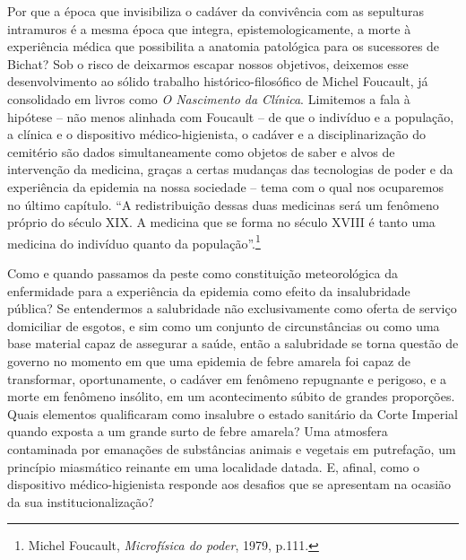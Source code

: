 Por que a época que invisibiliza o cadáver da convivência com as
sepulturas intramuros é a mesma época que integra, epistemologicamente,
a morte à experiência médica que possibilita a anatomia patológica para
os sucessores de Bichat? Sob o risco de deixarmos escapar nossos
objetivos, deixemos esse desenvolvimento ao sólido trabalho
histórico-filosófico de Michel Foucault, já consolidado em livros como
\emph{O Nascimento da Clínica}. Limitemos a fala à hipótese -- não menos
alinhada com Foucault -- de que o indivíduo e a população, a clínica e o
dispositivo médico-higienista, o cadáver e a disciplinarização do
cemitério são dados simultaneamente como objetos de saber e alvos de
intervenção da medicina, graças a certas mudanças das tecnologias de
poder e da experiência da epidemia na nossa sociedade -- tema com o qual
nos ocuparemos no último capítulo. ``A redistribuição dessas duas
medicinas será um fenômeno próprio do século XIX. A medicina que se
forma no século XVIII é tanto uma medicina do indivíduo quanto da
população''.\footnote{Michel Foucault, \emph{Microfísica do poder},
  1979, p.111.}

Como e quando passamos da peste como constituição meteorológica da
enfermidade para a experiência da epidemia como efeito da insalubridade
pública? Se entendermos a salubridade não exclusivamente como oferta de
serviço domiciliar de esgotos, e sim como um conjunto de circunstâncias
ou como uma base material capaz de assegurar a saúde, então a
salubridade se torna questão de governo no momento em que uma epidemia
de febre amarela foi capaz de transformar, oportunamente, o cadáver em
fenômeno repugnante e perigoso, e a morte em fenômeno insólito, em um
acontecimento súbito de grandes proporções. Quais elementos qualificaram
como insalubre o estado sanitário da Corte Imperial quando exposta a um
grande surto de febre amarela? Uma atmosfera contaminada por emanações
de substâncias animais e vegetais em putrefação, um princípio miasmático
reinante em uma localidade datada. E, afinal, como o dispositivo
médico-higienista responde aos desafios que se apresentam na ocasião da
sua institucionalização?

